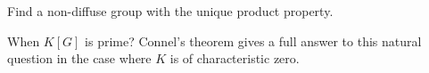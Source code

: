 \begin{problem}
	Find a non-diffuse group with the unique product property.
\end{problem}

%
%
%
%
%
%
%
%	


When $K[G]$ is prime? Connel's theorem gives a full answer to this natural
question in the case where $K$ is of characteristic zero. 

